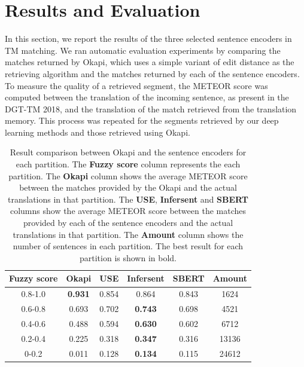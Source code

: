 \section{Results and Evaluation}
\label{sec:tm_sentence_encoders_results}
In this section, we report the results of the three selected sentence encoders in TM matching. We ran automatic evaluation experiments by comparing the matches returned by Okapi, which uses a simple variant of edit distance as the retrieving algorithm and the matches returned by each of the sentence encoders. To measure the quality of a retrieved segment, the METEOR score was computed between the translation of the incoming sentence, as present in the DGT-TM 2018, and the translation of the match retrieved from the translation memory. This process was repeated for the segments retrieved by our deep learning methods and those retrieved using Okapi. 

\begin{table}[ht!]
	\centering
		\begin{tabular}{|c|c|c|c|c|c|}
			\hline
			\textbf{Fuzzy score} & \textbf{Okapi} & \textbf{USE} & \textbf{Infersent} & \textbf{SBERT} & \textbf{Amount} \\ 
			\hline
			0.8-1.0 & \textbf{0.931} & 0.854 & 0.864 & 0.843 &1624\\
			\hline
			0.6-0.8 & 0.693 & 0.702 & \textbf{0.743} & 0.698 & 4521\\
			\hline
			0.4-0.6 & 0.488 & 0.594 & \textbf{0.630} & 0.602 & 6712\\
			\hline
			0.2-0.4 & 0.225 & 0.318 & \textbf{0.347} & 0.316 & 13136 \\
			\hline
			0-0.2 & 0.011 & 0.128 & \textbf{0.134} & 0.115 & 24612 \\
			\hline
		\end{tabular}
		\caption[Result comparison between Okapi and the sentence encoders]{Result comparison between Okapi and the sentence encoders for each partition. The \textbf{Fuzzy score} column represents the each partition. The \textbf{Okapi} column shows the average METEOR score between the matches provided by the Okapi and the actual translations in that partition. The \textbf{USE}, \textbf{Infersent} and \textbf{SBERT} columns show the average METEOR score between the matches provided by each of the sentence encoders and the actual translations in that partition. The \textbf{Amount} column shows the number of sentences in each partition. The best result for each partition is shown in bold.}
		\label{tab:tm_sentence_encoder_results}
\end{table}

